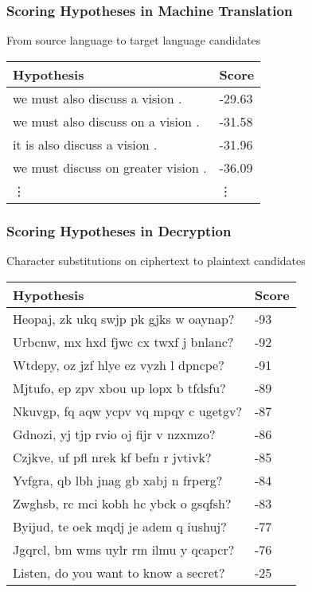 \begin{frame}[fragile]
\frametitle{Scoring Hypotheses in Machine Translation}
\centering
\begin{block}{From source language to target language candidates}
\begin{tabular}{ll}
\rowcolor{MidnightBlue!50}
Hypothesis & Score \\
\hline
we must also discuss a vision . & -29.63 \\
we must also discuss on a vision . & -31.58 \\
it is also discuss a vision . & -31.96 \\
we must discuss on greater vision . & -36.09 \\
\vdots & \vdots \\
\end{tabular}
\end{block}
\end{frame}

\begin{frame}
\frametitle{Scoring Hypotheses in Decryption}
\centering
\begin{block}{Character substitutions on ciphertext to plaintext candidates}
\begin{tabular}{ll}
\rowcolor{MidnightBlue!50}
Hypothesis & Score \\
\hline
Heopaj, zk ukq swjp pk gjks w oaynap? & -93\\
Urbcnw, mx hxd fjwc cx twxf j bnlanc? & -92\\
Wtdepy, oz jzf hlye ez vyzh l dpncpe? & -91\\
Mjtufo, ep zpv xbou up lopx b tfdsfu? & -89\\
Nkuvgp, fq aqw ycpv vq mpqy c ugetgv? & -87\\
Gdnozi, yj tjp rvio oj fijr v nzxmzo? & -86\\
Czjkve, uf pfl nrek kf befn r jvtivk? & -85\\
Yvfgra, qb lbh jnag gb xabj n frperg? & -84\\
Zwghsb, rc mci kobh hc ybck o gsqfsh? & -83\\
Byijud, te oek mqdj je adem q iushuj? & -77\\
Jgqrcl, bm wms uylr rm ilmu y qcapcr? & -76\\
Listen, do you want to know a secret? & -25\\
\end{tabular}
\end{block}
\end{frame}

